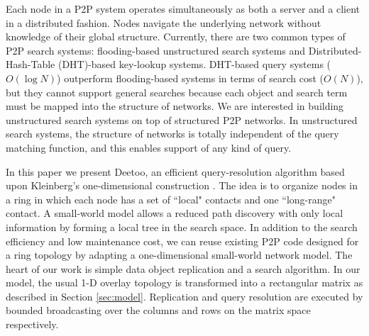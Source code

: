 \documentclass[9.5pt,journal,final,finalsubmission,twocolumn]{IEEEtran}
\begin{document}
Each node in a P2P system operates simultaneously as both a server and a client
in a distributed fashion. Nodes navigate the
underlying network without knowledge of their global structure. 
Currently, there are two common types of P2P search systems: flooding-based
unstructured search systems and Distributed-Hash-Table (DHT)-based key-lookup systems. 
DHT-based query systems ($O(\log N)$) outperform flooding-based systems in terms of 
search cost ($O(N)$), but they cannot support general searches because each object
and search term must be mapped into the structure of networks.
We are interested in building unstructured search systems on top of 
structured P2P networks. In unstructured search systems, 
the structure of networks is totally independent of the query matching 
function, and this enables support of any kind of query.  

In this paper we present Deetoo, an efficient query-resolution 
algorithm based upon Kleinberg's one-dimensional construction
\cite{jk:Algorithmic}. The idea is to organize nodes in a ring in which 
each node has a set of ``local" contacts and one ``long-range" 
contact. 
A small-world model allows a reduced path discovery 
with only local information by forming a local tree in the search space. 
In addition to the search efficiency and low maintenance cost, 
we can reuse existing P2P code designed for a ring topology by adapting 
a one-dimensional small-world network model.
The heart of our work is simple data object replication and a search 
algorithm. In our model, the usual 1-D
overlay topology is transformed into a rectangular 
matrix as described in Section \ref{sec:model}.  Replication and 
query resolution are executed by bounded broadcasting over the 
columns and rows on the matrix space respectively.
\end{document}
